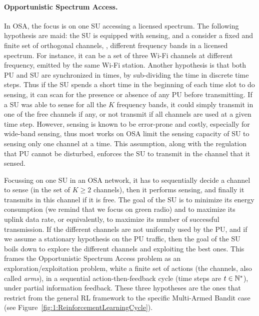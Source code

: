 \paragraph{Opportunistic Spectrum Access.}
%
In OSA, the focus is on one SU accessing a licensed spectrum.
%
The following hypothesis are maid:
the SU is equipped with sensing,
and a consider a fixed and finite set of orthogonal channels, \ie, different frequency bands in a licensed spectrum.
For instance, it can be a set of three Wi-Fi channels at different frequency, emitted by the same Wi-Fi station.
Another hypothesis is that both PU and SU are synchronized in times, by sub-dividing the time in discrete time steps.
%
Thus if the SU spends a short time in the beginning of each time slot to do sensing, it can scan for the presence or absence of any PU before transmitting.
If a SU was able to sense for all the $K$ frequency bands, it could simply transmit in one of the free channels if any, or not transmit if all channels are used at a given time step.
However, sensing is known to be error-prone and costly, especially for wide-band sensing, thus most works on OSA limit the sensing capacity of SU to sensing only one channel at a time. This assumption, along with the regulation that PU cannot be disturbed, enforces the SU to transmit in the channel that it sensed.

Focussing on one SU in an OSA network, it has to sequentially decide a channel to sense (in the set of $K\geq2$ channels), then it performs sensing, and finally it transmits in this channel if it is free.
The goal of the SU is to minimize its energy consumption (we remind that we focus on green radio) and to maximize its uplink data rate, or equivalently, to maximize its number of successful transmission.
%
If the different channels are not uniformly used by the PU, and if we assume a stationary hypothesis on the PU traffic, then the goal of the SU boils down to explore the different channels and exploiting the best ones.
This frames the Opportunistic Spectrum Access problem as an exploration/exploitation problem, white a finite set of actions (the channels, also called \emph{arms}),
in a sequential action-then-feedback cycle (time steps are $t\in\mathbb{N}^*$),
under partial information feedback.
These three hypotheses are the ones that restrict from the general RL framework to the specific Multi-Armed Bandit case (see Figure~\ref{fig:1:ReinforcementLearningCycle}).


